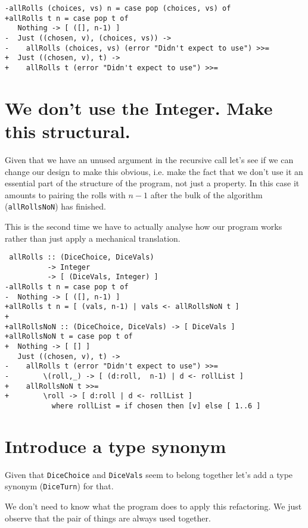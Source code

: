 \begin{verbatim}
-allRolls (choices, vs) n = case pop (choices, vs) of
+allRolls t n = case pop t of
   Nothing -> [ ([], n-1) ]
-  Just ((chosen, v), (choices, vs)) ->
-    allRolls (choices, vs) (error "Didn't expect to use") >>=
+  Just ((chosen, v), t) ->
+    allRolls t (error "Didn't expect to use") >>=
\end{verbatim}

\section{We don't use the Integer. Make this structural.}


Given that we have an unused argument in the recursive call let's see if we can change our design to make this obvious, i.e. make the fact that we don't use it an essential part of the structure of the program, not just a property. In this case it amounts to pairing the rolls with $n-1$ after the bulk of the algorithm (\texttt{allRollsNoN}) has finished.

This is the second time we have to actually analyse how our program works rather than just apply a mechanical translation.

\begin{verbatim}
 allRolls :: (DiceChoice, DiceVals)
          -> Integer
          -> [ (DiceVals, Integer) ]
-allRolls t n = case pop t of
-  Nothing -> [ ([], n-1) ]
+allRolls t n = [ (vals, n-1) | vals <- allRollsNoN t ]
+
+allRollsNoN :: (DiceChoice, DiceVals) -> [ DiceVals ]
+allRollsNoN t = case pop t of
+  Nothing -> [ [] ]
   Just ((chosen, v), t) ->
-    allRolls t (error "Didn't expect to use") >>=
-        \(roll,_) -> [ (d:roll,  n-1) | d <- rollList ]
+    allRollsNoN t >>=
+        \roll -> [ d:roll | d <- rollList ]
           where rollList = if chosen then [v] else [ 1..6 ]
\end{verbatim}

\section{Introduce a type synonym}


Given that \texttt{DiceChoice} and \texttt{DiceVals} seem to belong together let's add a type synonym (\texttt{DiceTurn}) for that.

We don't need to know what the program does to apply this refactoring. We just observe that the pair of things are always used together.

